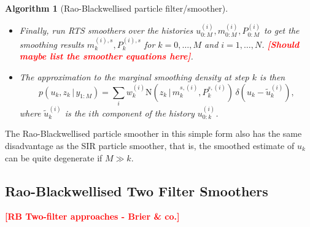 \documentclass[twocolumn]{autart}    %
\newcommand{\comment}[1]{\textcolor{red}{\textbf{[#1]}}}
\newtheorem{algo}{Algorithm}[section]
\begin{document}
\begin{algo}[Rao-Blackwellised particle filter/smoother]
\begin{itemize}
\begin{enumerate}
\item Compute importance weights as follows:
  \begin{equation}
    w_k^{(i)} \propto w_{k-1}^{(i)}
     \frac{p(u_{k}^{(i)} \, | \, u_{k-1}^{(i)}) \,
          \mathrm{N}(y_k \, | \, \mu_k^{(i)},S_k^{(i)})}
          {q(u_{k}^{(i)} \, | \, u_{0:k-1}^{(i)},y_{1:k})}. \\
  \end{equation}

\item Resample the set of histories $\{
  w_k^{(i)},u_{0:k}^{(i)},m_{0:k}^{(i)},P_{0:k}^{(i)}~:~i=1,\ldots,N
  \}$ if needed.
\end{enumerate}

\item Finally, run RTS smoothers over the histories $u_{0:M}^{(i)}, m_{0:M}^{(i)}, P_{0:M}^{(i)}$
  to get the smoothing results $m_k^{(i),s},P_k^{(i),s}$ for $k=0,\ldots,M$ and $i=1,\ldots,N$.
  \comment{Should maybe list the smoother equations here}.

\item The approximation to the marginal smoothing density at step $k$
  is then
%
\begin{equation}
  p(u_k,z_k\,|\,y_{1:M})
  = \sum_i w_k^{(i)} \mathrm{N}(z_k\,|\,m_k^{s,(i)},P_k^{s,(i)}) \,
  \delta(u_k - \tilde{u}_k^{(i)}),
\nonumber
\end{equation}
%
where $\tilde{u}_k^{(i)}$ is the $i$th component of the history
$u_{0:k}^{(i)}$.
\end{itemize}
\end{algo}
%
The Rao-Blackwellised particle smoother in this simple form also has the same disadvantage as the SIR particle smoother, that is, the smoothed estimate of $u_{k}$ can be quite degenerate if $M \gg k$.



\subsection{Rao-Blackwellised Two Filter Smoothers}

\comment{RB Two-filter approaches - Brier \& co.}
\end{document}
